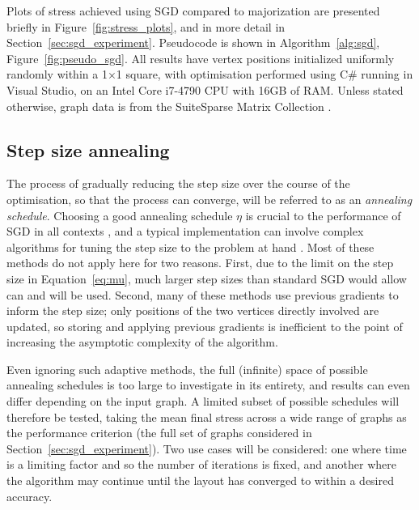 Plots of stress achieved using SGD compared to majorization are presented briefly in Figure~\ref{fig:stress_plots}, and in more detail in Section~\ref{sec:sgd_experiment}. Pseudocode is shown in Algorithm~\ref{alg:sgd}, Figure~\ref{fig:pseudo_sgd}.
All results have vertex positions initialized uniformly randomly within a 1$\times$1 square, with optimisation performed using C\# running in Visual Studio, on an Intel Core i7-4790 CPU with 16GB of RAM.
Unless stated otherwise, graph data is from the SuiteSparse Matrix Collection \cite{Davis2011}.

\subsection{Step size annealing}
\label{sec:annealing}
The process of gradually reducing the step size over the course of the optimisation, so that the process can converge, will be referred to as an \emph{annealing schedule}.
Choosing a good annealing schedule $\eta$ is crucial to the performance of SGD in all contexts \cite{Darken1992}, and a typical implementation can involve complex algorithms for tuning the step size to the problem at hand \cite{Ruder2016}.
Most of these methods do not apply here for two reasons. First, due to the limit on the step size in Equation~\eqref{eq:mu}, much larger step sizes than standard SGD would allow can and will be used. Second, many of these methods use previous gradients to inform the step size; only positions of the two vertices directly involved are updated, so storing and applying previous gradients is inefficient to the point of increasing the asymptotic complexity of the algorithm.

Even ignoring such adaptive methods, the full (infinite) space of possible annealing schedules is too large to investigate in its entirety, and results can even differ depending on the input graph. A limited subset of possible schedules will therefore be tested, taking the mean final stress across a wide range of graphs as the performance criterion
(the full set of graphs considered in Section~\ref{sec:sgd_experiment}).
Two use cases will be considered: one where time is a limiting factor and so the number of iterations is fixed, and another where the algorithm may continue until the layout has converged to within a desired accuracy.


